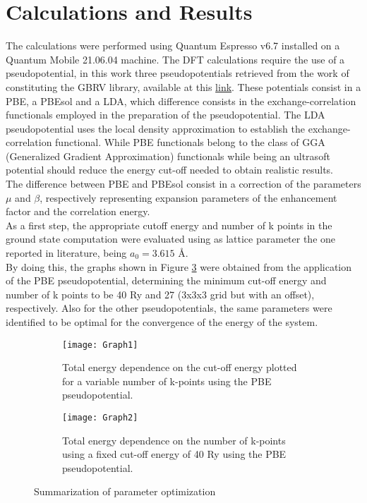 \documentclass[
	12pt, %
]{fphw}
\begin{document}
\section*{Calculations and Results}
The calculations were performed using Quantum Espresso v6.7 \citep{giannozzi_advanced_2017} installed on a Quantum Mobile 21.06.04 machine. 
The DFT calculations require the use of a pseudopotential, in this work three pseudopotentials retrieved from the work of \citet{garrity_pseudopotentials_2014} constituting the GBRV library, available at this \href{http://physics.rutgers.edu/gbrv}{link}.
These potentials consist in a PBE, a PBEsol and a LDA, which difference consists in the exchange-correlation functionals employed in the preparation of the pseudopotential. 
The LDA pseudopotential uses the local density approximation  to establish the exchange-correlation functional.
While PBE functionals belong to the class of GGA (Generalized Gradient Approximation) functionals while being an ultrasoft potential should reduce the energy cut-off needed to obtain realistic results.\citep{perdew_generalized_1996}\\
The difference between PBE and PBEsol consist in a correction of the parameters $\mu$ and $\beta$, respectively representing expansion parameters of the enhancement factor and the correlation energy.\cite{perdew_restoring_2008} \\
As a first step, the appropriate cutoff energy and number of k points in the ground state computation were evaluated using as lattice parameter the one reported in literature, being $a_{0}=3.615$ \r{A}. \citep{krull_lattice_1970}\\
By doing this, the graphs shown in Figure \ref{pre} were obtained from the application of the PBE pseudopotential, determining the minimum cut-off energy and number of k points to be 40 Ry and 27 (3x3x3 grid but with an offset), respectively.
Also for the other pseudopotentials, the same parameters were identified to be optimal for the convergence of the energy of the system.
\begin{figure}
	\centering
	\begin{subfigure}{0.4\textwidth}
		\texttt{[image: Graph1]}
		\caption{Total energy dependence on the cut-off energy plotted for a variable number of k-points using the PBE pseudopotential.}
		\label{fig:first}
	\end{subfigure}
	\hfill
	\begin{subfigure}{0.4\textwidth}
		\texttt{[image: Graph2]}
		\caption{Total energy dependence on the number of k-points using a fixed cut-off energy of 40 Ry using the PBE pseudopotential.}
		\label{fig:second}
	\end{subfigure}
\caption{Summarization of parameter optimization}
	\label{pre}
\end{figure}
\end{document}
